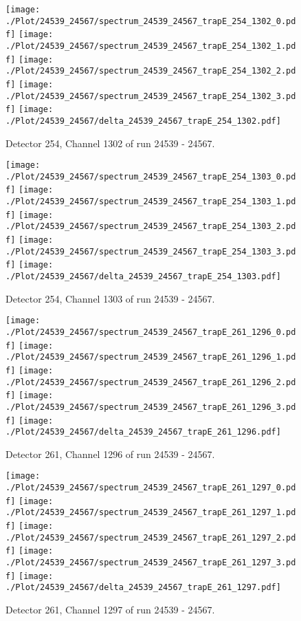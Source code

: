 \clearpage
\begin{figure}[hb]
\centering
\texttt{[image: ./Plot/24539\_24567/spectrum\_24539\_24567\_trapE\_254\_1302\_0.pdf]}
\texttt{[image: ./Plot/24539\_24567/spectrum\_24539\_24567\_trapE\_254\_1302\_1.pdf]}
\texttt{[image: ./Plot/24539\_24567/spectrum\_24539\_24567\_trapE\_254\_1302\_2.pdf]}
\texttt{[image: ./Plot/24539\_24567/spectrum\_24539\_24567\_trapE\_254\_1302\_3.pdf]}
\texttt{[image: ./Plot/24539\_24567/delta\_24539\_24567\_trapE\_254\_1302.pdf]}
\caption{ Detector 254, Channel 1302 of run 24539 - 24567.}
\label{fig:24539_24567_trapE_254_1302}
\end{figure}
\clearpage
\begin{figure}[hb]
\centering
\texttt{[image: ./Plot/24539\_24567/spectrum\_24539\_24567\_trapE\_254\_1303\_0.pdf]}
\texttt{[image: ./Plot/24539\_24567/spectrum\_24539\_24567\_trapE\_254\_1303\_1.pdf]}
\texttt{[image: ./Plot/24539\_24567/spectrum\_24539\_24567\_trapE\_254\_1303\_2.pdf]}
\texttt{[image: ./Plot/24539\_24567/spectrum\_24539\_24567\_trapE\_254\_1303\_3.pdf]}
\texttt{[image: ./Plot/24539\_24567/delta\_24539\_24567\_trapE\_254\_1303.pdf]}
\caption{ Detector 254, Channel 1303 of run 24539 - 24567.}
\label{fig:24539_24567_trapE_254_1303}
\end{figure}
\clearpage
\begin{figure}[hb]
\centering
\texttt{[image: ./Plot/24539\_24567/spectrum\_24539\_24567\_trapE\_261\_1296\_0.pdf]}
\texttt{[image: ./Plot/24539\_24567/spectrum\_24539\_24567\_trapE\_261\_1296\_1.pdf]}
\texttt{[image: ./Plot/24539\_24567/spectrum\_24539\_24567\_trapE\_261\_1296\_2.pdf]}
\texttt{[image: ./Plot/24539\_24567/spectrum\_24539\_24567\_trapE\_261\_1296\_3.pdf]}
\texttt{[image: ./Plot/24539\_24567/delta\_24539\_24567\_trapE\_261\_1296.pdf]}
\caption{ Detector 261, Channel 1296 of run 24539 - 24567.}
\label{fig:24539_24567_trapE_261_1296}
\end{figure}
\clearpage
\begin{figure}[hb]
\centering
\texttt{[image: ./Plot/24539\_24567/spectrum\_24539\_24567\_trapE\_261\_1297\_0.pdf]}
\texttt{[image: ./Plot/24539\_24567/spectrum\_24539\_24567\_trapE\_261\_1297\_1.pdf]}
\texttt{[image: ./Plot/24539\_24567/spectrum\_24539\_24567\_trapE\_261\_1297\_2.pdf]}
\texttt{[image: ./Plot/24539\_24567/spectrum\_24539\_24567\_trapE\_261\_1297\_3.pdf]}
\texttt{[image: ./Plot/24539\_24567/delta\_24539\_24567\_trapE\_261\_1297.pdf]}
\caption{ Detector 261, Channel 1297 of run 24539 - 24567.}
\label{fig:24539_24567_trapE_261_1297}
\end{figure}
